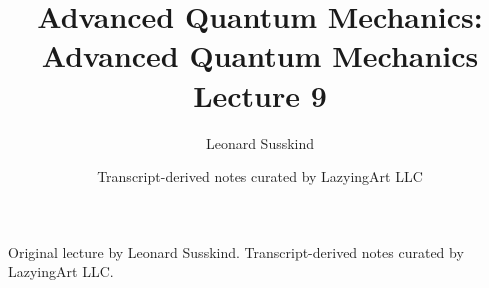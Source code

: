 \documentclass[11pt,oneside]{book}
\begin{document}
\frontmatter
\title{Advanced Quantum Mechanics: Advanced Quantum Mechanics Lecture 9}
\author{Leonard Susskind}
\date{Transcript-derived notes curated by LazyingArt LLC}
\maketitle
\begin{center}
\small Original lecture by Leonard Susskind. Transcript-derived notes curated by LazyingArt LLC.
\end{center}
\clearpage
\mainmatter

\end{document}
